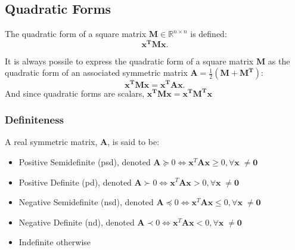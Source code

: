\subsection{Quadratic Forms}
The quadratic form of a square matrix $\mathbf{M}\in \mathbb{R}^{n\times n}$ is defined:
\[\mathbf{x^{T}Mx}.\] 
\begin{remark}
  It is always possile to express the quadratic form of a square matrix $\mathbf{M}$ as the
  quadratic form of an associated symmetric matrix $\mathbf{A}=\frac{1}{2}(\mathbf{M+M^{T}})$:
  \[\mathbf{x^{T}Mx=x^{T}Ax}.\]
  And since quadratic forms are scalars, $\mathbf{x^{T}Mx=x^{T}M^{T}x}$
\end{remark}
\subsubsection{Definiteness}

A real symmetric matrix, $\mathbf{A}$, is said to be:
\begin{itemize}
  \item Positive Semidefinite (psd), denoted $\mathbf{A} \succeq 0 \iff
    \mathbf{x}^{T} \mathbf{A} \mathbf{x} \geq 0, \forall \mathbf{x} \; \neq
    \mathbf{0}$
  \item Positive Definite (pd), denoted $\mathbf{A} \succ 0 \iff \mathbf{x}^{T}
    \mathbf{A} \mathbf{x} > 0, \forall \mathbf{x} \; \neq \mathbf{0}$
  \item Negative Semidefinite (nsd), denoted $\mathbf{A} \preceq 0 \iff
    \mathbf{x}^{T} \mathbf{A} \mathbf{x} \leq 0, \forall \mathbf{x} \; \neq
    \mathbf{0}$
  \item Negative Definite (nd), denoted $\mathbf{A} \prec 0 \iff \mathbf{x}^{T}
    \mathbf{A} \mathbf{x} < 0, \forall \mathbf{x} \; \neq \mathbf{0}$
  \item Indefinite otherwise
\end{itemize}
